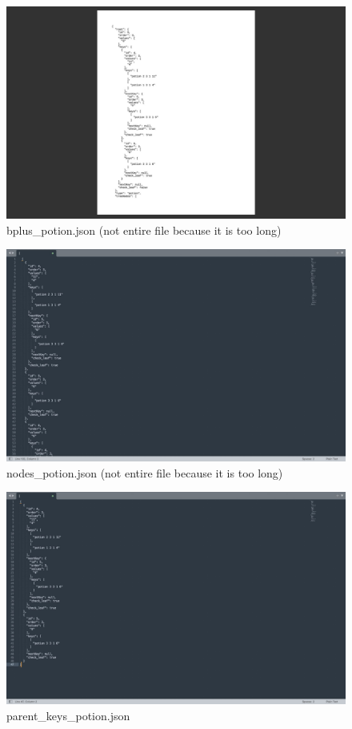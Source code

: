 \documentclass{article}
\begin{document}
\begin{figure}[H]
    \centering
    \includegraphics[width=.8\textwidth]{figures/bplus.jpg}
    \caption{bplus\_potion.json (not entire file because it is too long)}
\end{figure}
\begin{figure}[H]
    \centering
    \includegraphics[width=.8\textwidth]{figures/node.jpg}
    \caption{nodes\_potion.json (not entire file because it is too long)}
\end{figure}
\begin{figure}[H]
    \centering
    \includegraphics[width=.8\textwidth]{figures/parent_keys.jpg}
    \caption{parent\_keys\_potion.json }
\end{figure}
\end{document}
